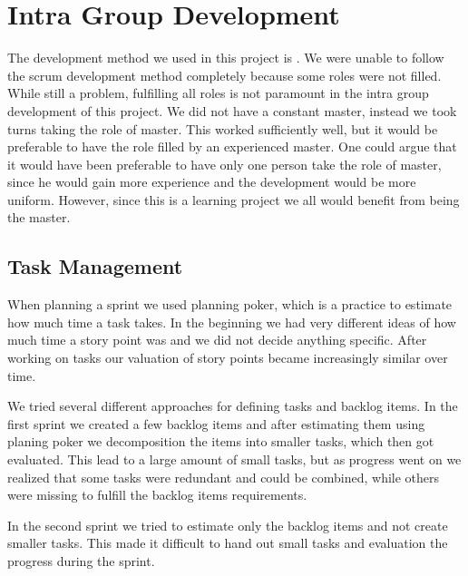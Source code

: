 \section{Intra Group Development}
\label{sec:intragroupdev}

The development method we used in this project is \scrum{}.
We were unable to follow the scrum development method completely because some roles were not filled.
While still a problem, fulfilling all roles is not paramount in the intra group development of this project.
We did not have a constant \scrum{} master, instead we took turns taking the role of \scrum{} master.
This worked sufficiently well, but it would be preferable to have the role filled by an experienced \scrum{} master.
One could argue that it would have been preferable to have only one person take the role of \scrum{} master, since he would gain more experience and the development would be more uniform.
However, since this is a learning project we all would benefit from being the \scrum{} master.


\subsection{Task Management}
When planning a sprint we used planning poker, which is a \scrum{} practice to estimate how much time a task takes. 
In the beginning we had very different ideas of how much time a story point was and we did not decide anything specific. 
After working on tasks our valuation of story points became increasingly similar over time.

We tried several different approaches for defining tasks and backlog items. 
In the first sprint we created a few backlog items and after estimating them using planing poker we decomposition the items into smaller tasks, which then got evaluated. 
This lead to a large amount of small tasks, but as progress went on we realized that some tasks were redundant and could be combined, while others were missing to fulfill the backlog items requirements. 

In the second sprint we tried to estimate only the backlog items and not create smaller tasks. 
This made it difficult to hand out small tasks and evaluation the progress during the sprint. 

